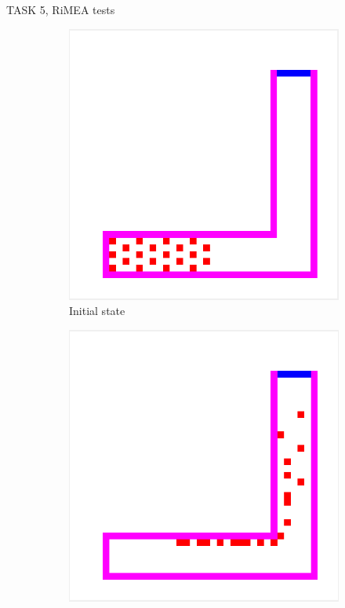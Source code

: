 \documentclass[10pt,a4paper]{article}
\begin{document}
\begin{task}{TASK 5, RiMEA tests}
\begin{figure}[htbp]
  \centering
  \begin{subfigure}[b]{0.31\textwidth}
    \includegraphics[width=\textwidth]{pictures/test3_initial.png}
    \caption{Initial state}
    \label{fig:test3_initial}
  \end{subfigure}
  \begin{subfigure}[b]{0.31\textwidth}
    \includegraphics[width=\textwidth]{pictures/test3_intermediate.png}

\end{subfigure}
\end{figure}
\end{task}
\end{document}
